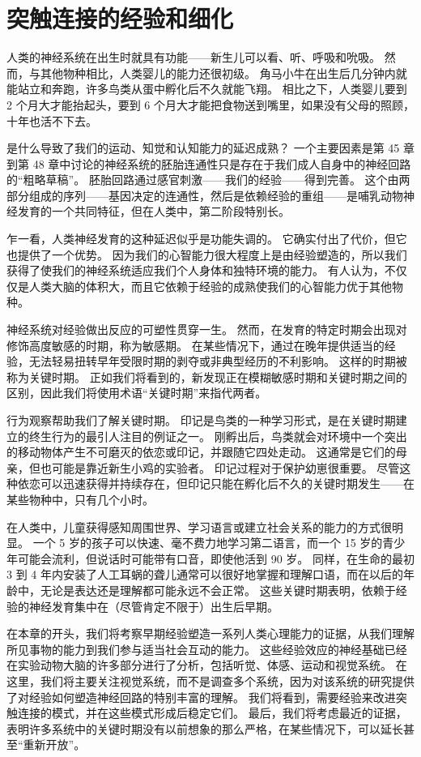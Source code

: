 \chapter{突触连接的经验和细化} \label{chap:chap49}
人类的神经系统在出生时就具有功能——新生儿可以看、听、呼吸和吮吸。 然而，与其他物种相比，人类婴儿的能力还很初级。 角马小牛在出生后几分钟内就能站立和奔跑，许多鸟类从蛋中孵化后不久就能飞翔。 相比之下，人类婴儿要到 2 个月大才能抬起头，要到 6 个月大才能把食物送到嘴里，如果没有父母的照顾，十年也活不下去。

是什么导致了我们的运动、知觉和认知能力的延迟成熟？ 一个主要因素是第 45 章到第 48 章中讨论的神经系统的胚胎连通性只是存在于我们成人自身中的神经回路的“粗略草稿”。 胚胎回路通过感官刺激——我们的经验——得到完善。 这个由两部分组成的序列——基因决定的连通性，然后是依赖经验的重组——是哺乳动物神经发育的一个共同特征，但在人类中，第二阶段特别长。

乍一看，人类神经发育的这种延迟似乎是功能失调的。 它确实付出了代价，但它也提供了一个优势。 因为我们的心智能力很大程度上是由经验塑造的，所以我们获得了使我们的神经系统适应我们个人身体和独特环境的能力。 有人认为，不仅仅是人类大脑的体积大，而且它依赖于经验的成熟使我们的心智能力优于其他物种。

神经系统对经验做出反应的可塑性贯穿一生。 然而，在发育的特定时期会出现对修饰高度敏感的时期，称为敏感期。 在某些情况下，通过在晚年提供适当的经验，无法轻易扭转早年受限时期的剥夺或非典型经历的不利影响。 这样的时期被称为关键时期。 正如我们将看到的，新发现正在模糊敏感时期和关键时期之间的区别，因此我们将使用术语“关键时期”来指代两者。

行为观察帮助我们了解关键时期。 印记是鸟类的一种学习形式，是在关键时期建立的终生行为的最引人注目的例证之一。 刚孵出后，鸟类就会对环境中一个突出的移动物体产生不可磨灭的依恋或印记，并跟随它四处走动。 这通常是它们的母亲，但也可能是靠近新生小鸡的实验者。 印记过程对于保护幼崽很重要。 尽管这种依恋可以迅速获得并持续存在，但印记只能在孵化后不久的关键时期发生——在某些物种中，只有几个小时。

在人类中，儿童获得感知周围世界、学习语言或建立社会关系的能力的方式很明显。 一个 5 岁的孩子可以快速、毫不费力地学习第二语言，而一个 15 岁的青少年可能会流利，但说话时可能带有口音，即使他活到 90 岁。 同样，在生命的最初 3 到 4 年内安装了人工耳蜗的聋儿通常可以很好地掌握和理解口语，而在以后的年龄中，无论是表达还是理解都可能永远不会正常。 这些关键时期表明，依赖于经验的神经发育集中在（尽管肯定不限于）出生后早期。

在本章的开头，我们将考察早期经验塑造一系列人类心理能力的证据，从我们理解所见事物的能力到我们参与适当社会互动的能力。 这些经验效应的神经基础已经在实验动物大脑的许多部分进行了分析，包括听觉、体感、运动和视觉系统。 在这里，我们将主要关注视觉系统，而不是调查多个系统，因为对该系统的研究提供了对经验如何塑造神经回路的特别丰富的理解。 我们将看到，需要经验来改进突触连接的模式，并在这些模式形成后稳定它们。 最后，我们将考虑最近的证据，表明许多系统中的关键时期没有以前想象的那么严格，在某些情况下，可以延长甚至“重新开放”。

